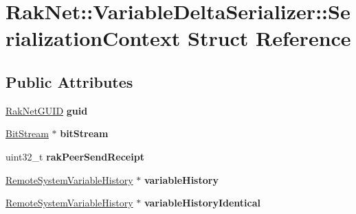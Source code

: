 \hypertarget{struct_rak_net_1_1_variable_delta_serializer_1_1_serialization_context}{\section{Rak\-Net\-:\-:Variable\-Delta\-Serializer\-:\-:Serialization\-Context Struct Reference}
\label{struct_rak_net_1_1_variable_delta_serializer_1_1_serialization_context}
}
\subsection*{Public Attributes}
\begin{DoxyCompactItemize}
\item 
\hypertarget{struct_rak_net_1_1_variable_delta_serializer_1_1_serialization_context_a7024a4159ed3b2b9e8e02b2f2ba4306a}{\hyperlink{struct_rak_net_1_1_rak_net_g_u_i_d}{Rak\-Net\-G\-U\-I\-D} {\bfseries guid}}\label{struct_rak_net_1_1_variable_delta_serializer_1_1_serialization_context_a7024a4159ed3b2b9e8e02b2f2ba4306a}

\item 
\hypertarget{struct_rak_net_1_1_variable_delta_serializer_1_1_serialization_context_abf3631cc6a34097294a059c3747ff118}{\hyperlink{class_rak_net_1_1_bit_stream}{Bit\-Stream} $\ast$ {\bfseries bit\-Stream}}\label{struct_rak_net_1_1_variable_delta_serializer_1_1_serialization_context_abf3631cc6a34097294a059c3747ff118}

\item 
\hypertarget{struct_rak_net_1_1_variable_delta_serializer_1_1_serialization_context_afbd13a07354a29310a9c722aacc60084}{uint32\-\_\-t {\bfseries rak\-Peer\-Send\-Receipt}}\label{struct_rak_net_1_1_variable_delta_serializer_1_1_serialization_context_afbd13a07354a29310a9c722aacc60084}

\item 
\hypertarget{struct_rak_net_1_1_variable_delta_serializer_1_1_serialization_context_afef61f36f767cd5930e8bfa729958239}{\hyperlink{struct_rak_net_1_1_variable_delta_serializer_1_1_remote_system_variable_history}{Remote\-System\-Variable\-History} $\ast$ {\bfseries variable\-History}}\label{struct_rak_net_1_1_variable_delta_serializer_1_1_serialization_context_afef61f36f767cd5930e8bfa729958239}

\item 
\hypertarget{struct_rak_net_1_1_variable_delta_serializer_1_1_serialization_context_a942b635bddb270840f3814b67e08f999}{\hyperlink{struct_rak_net_1_1_variable_delta_serializer_1_1_remote_system_variable_history}{Remote\-System\-Variable\-History} $\ast$ {\bfseries variable\-History\-Identical}}\label{struct_rak_net_1_1_variable_delta_serializer_1_1_serialization_context_a942b635bddb270840f3814b67e08f999}


\end{DoxyCompactItemize}
